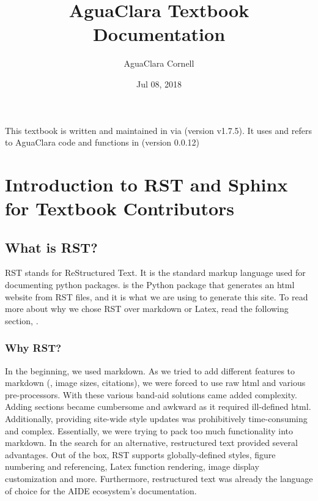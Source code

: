 \documentclass[letterpaper,10pt,english]{sphinxmanual}
\title{AguaClara Textbook Documentation}
\date{Jul 08, 2018}
\author{AguaClara Cornell}
\begin{document}
\maketitle
\sphinxtableofcontents
{}\label{\detokenize{index::doc}}


This textbook is written and maintained in  via  (version v1.7.5). It uses and refers to AguaClara code and functions in  (version 0.0.12)


\chapter{Introduction to RST and Sphinx for Textbook Contributors}
\label{\detokenize{Textbook_Creation_Help/rst_intro:introduction-to-rst-and-sphinx-for-textbook-contributors}}\label{\detokenize{Textbook_Creation_Help/rst_intro:rst-intro}}\label{\detokenize{Textbook_Creation_Help/rst_intro::doc}}

\section{What is RST?}
\label{\detokenize{Textbook_Creation_Help/rst_intro:what-is-rst}}\label{\detokenize{Textbook_Creation_Help/rst_intro:id1}}
RST stands for ReStructured Text. It is the standard markup language used for documenting python packages.  is the Python package that generates an html website from RST files, and it is what we are using to generate this site. To read more about why we chose RST over markdown or Latex, read the following section, {\hyperref[\detokenize{Textbook_Creation_Help/rst_intro:why-rst}]{}}.


\subsection{Why RST?}
\label{\detokenize{Textbook_Creation_Help/rst_intro:why-rst}}\label{\detokenize{Textbook_Creation_Help/rst_intro:id2}}
In the beginning, we used markdown. As we tried to add different features to markdown (, image sizes, citations), we were forced to use raw html and various pre-processors. With these various band-aid solutions came added complexity. Adding sections became cumbersome and awkward as it required ill-defined html. Additionally, providing site-wide style updates was prohibitively time-consuming and complex. Essentially, we were trying to pack too much functionality into markdown. In the search for an alternative, restructured text provided several advantages. Out of the box, RST supports globally-defined styles, figure numbering and referencing, Latex function rendering, image display customization and more. Furthermore, restructured text was already the language of choice for the AIDE ecosystem’s documentation.
\end{document}
